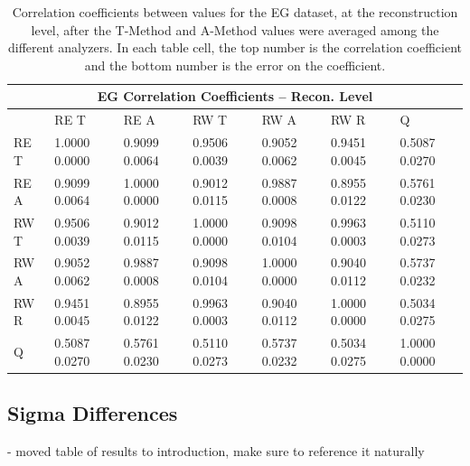 \begin{table}
\setlength\tabcolsep{15pt}
\footnotesize
\centering
\renewcommand{\arraystretch}{1.4}
\begin{tabularx}{0.8\linewidth}{@{\extracolsep{\fill}}lXXXXXX}
  \toprule
  	\multicolumn{7}{c}{{\normalsize EG Correlation Coefficients -- Recon. Level}} \\
  \midrule
  	       & RE T & RE A & RW T & RW A & RW R & \quad Q \\
  \midrule
	RE T   & 1.0000 0.0000 & 0.9099 0.0064 & 0.9506 0.0039 & 0.9052 0.0062 & 0.9451 0.0045 & 0.5087 0.0270  \\
	RE A   & 0.9099 0.0064 & 1.0000 0.0000 & 0.9012 0.0115 & 0.9887 0.0008 & 0.8955 0.0122 & 0.5761 0.0230  \\
	RW T   & 0.9506 0.0039 & 0.9012 0.0115 & 1.0000 0.0000 & 0.9098 0.0104 & 0.9963 0.0003 & 0.5110 0.0273  \\
	RW A   & 0.9052 0.0062 & 0.9887 0.0008 & 0.9098 0.0104 & 1.0000 0.0000 & 0.9040 0.0112 & 0.5737 0.0232  \\
	RW R   & 0.9451 0.0045 & 0.8955 0.0122 & 0.9963 0.0003 & 0.9040 0.0112 & 1.0000 0.0000 & 0.5034 0.0275  \\
	Q      & 0.5087 0.0270 & 0.5761 0.0230 & 0.5110 0.0273 & 0.5737 0.0232 & 0.5034 0.0275 & 1.0000 0.0000  \\
  \bottomrule
\end{tabularx}
\caption[]{Correlation coefficients between \R values for the EG dataset, at the reconstruction level, after the \RW T-Method and A-Method \R values were averaged among the different analyzers. In each table cell, the top number is the correlation coefficient and the bottom number is the error on the coefficient.}
\label{tab:Corrs_EG_recon}
\end{table}




\clearpage
\subsection{Sigma Differences}


- moved table of results to introduction, make sure to reference it naturally


